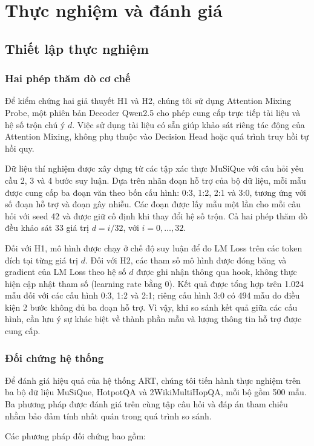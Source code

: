 \chapter{Thực nghiệm và đánh giá}
\label{chap:evaluation}
\section{Thiết lập thực nghiệm}
\subsection{Hai phép thăm dò cơ chế}
Để kiểm chứng hai giả thuyết H1 và H2, chúng tôi sử dụng Attention Mixing Probe, một phiên bản Decoder Qwen2.5 cho phép cung cấp trực tiếp tài liệu và hệ số trộn chú ý \(d\). Việc sử dụng tài liệu có sẵn giúp khảo sát riêng tác động của Attention Mixing, không phụ thuộc vào Decision Head hoặc quá trình truy hồi tự hồi quy.

Dữ liệu thí nghiệm được xây dựng từ các tập xác thực MuSiQue với câu hỏi yêu cầu 2, 3 và 4 bước suy luận. Dựa trên nhãn đoạn hỗ trợ của bộ dữ liệu, mỗi mẫu được cung cấp ba đoạn văn theo bốn cấu hình: 0:3, 1:2, 2:1 và 3:0, tương ứng với số đoạn hỗ trợ và đoạn gây nhiễu. Các đoạn được lấy mẫu một lần cho mỗi câu hỏi với seed 42 và được giữ cố định khi thay đổi hệ số trộn. Cả hai phép thăm dò đều khảo sát 33 giá trị \(d=i/32\), với \(i=0,\ldots,32\).

Đối với H1, mô hình được chạy ở chế độ suy luận để đo LM Loss trên các token đích tại từng giá trị \(d\). Đối với H2, các tham số mô hình được đóng băng và gradient của LM Loss theo hệ số \(d\) được ghi nhận thông qua hook, không thực hiện cập nhật tham số (learning rate bằng 0). Kết quả được tổng hợp trên 1.024 mẫu đối với các cấu hình 0:3, 1:2 và 2:1; riêng cấu hình 3:0 có 494 mẫu do điều kiện 2 bước không đủ ba đoạn hỗ trợ. Vì vậy, khi so sánh kết quả giữa các cấu hình, cần lưu ý sự khác biệt về thành phần mẫu và lượng thông tin hỗ trợ được cung cấp.

\subsection{Đối chứng hệ thống}
Để đánh giá hiệu quả của hệ thống ART, chúng tôi tiến hành thực nghiệm trên ba bộ dữ liệu MuSiQue, HotpotQA và 2WikiMultiHopQA, mỗi bộ gồm 500 mẫu. Ba phương pháp được đánh giá trên cùng tập câu hỏi và đáp án tham chiếu nhằm bảo đảm tính nhất quán trong quá trình so sánh.

Các phương pháp đối chứng bao gồm:

